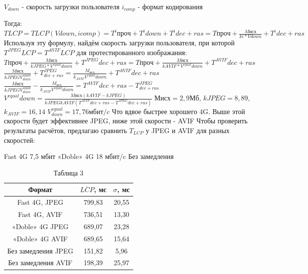 \documentclass[12pt]{article}
\begin{document}
$V_{down}$ - скорость загрузки пользователя
$i_{comp}$ - формат кодирования

Тогда:
$
T{LCP} = T{LCP}(V{down}, i{comp}) = T^{i}{проч} + T^{i}{down} + T^{i}{dec+ras} = T{проч} + \frac{M{исх}}{k{i}*V{down}} + T^{i}{dec+ras}
$
Используя эту формулу, найдём скорость загрузки пользователя, при которой $T^{JPEG}{LCP} = T^{AVIF}{LCP}$ для протестированного изображания:
$
T{проч} + \frac{M{исх}}{k{JPEG}*V^{equal}{down}} + T^{JPEG}{dec+ras} = T{проч} + \frac{M{исх}}{k{AVIF}*V^{equal}{down}} + T^{AVIF}{dec+ras}
$
$
\frac{M{исх}}{k{JPEG}V^{equal}_{down}} + T^{JPEG}_{dec+ras} = \frac{M_{исх}}{k_{AVIF}V^{equal}{down}} + T^{AVIF}{dec+ras}
$
$
\frac{M{исх}}{k{JPEG}V^{equal}_{down}} - \frac{M_{исх}}{k_{AVIF}V^{equal}{down}}  = T^{AVIF}{dec+ras} - T^{JPEG}_{dec+ras}
$
$
V^{equal}{down} = \frac{M{исх}(k{AVIF}-k{JPEG})}{k{JPEG}k{AVIF}(T^{AVIF}{dec+ras} - T^{JPEG}{dec+ras})}
$
$М{исх} = 2,9$Мб, $k{JPEG} = 8,89$, $k_{AVIF} = 16,14$
$
V^{equal}_{down} = 17,76 мбит/c
$
Что вдвое быстрее хорошего 4G. Выше этой скорости будет эффективнее JPEG, ниже этой скорости - AVIF
Чтобы проверить результаты расчётов, предлагаю сравнить $T_{LCP}$ у JPEG и AVIF для разных скоростей:

Fast 4G 7,5 мбит
«Doble» 4G 18 мбит/c
Без замедления

\begin{table}[h!]
\centering
\caption{Таблица 3}
\begin{tabular}{|c|c|c|}
\hline
Формат & $\overline{LCP}$, мс & $\sigma$, мс \\
\hline
Fast 4G, JPEG & 799,83 & 20,55 \\
\hline
Fast 4G, AVIF & 736,51 & 13,30 \\
\hline
«Doble» 4G JPEG & 689,07 & 23,28 \\
\hline
«Doble» 4G AVIF & 689,65 & 15,64 \\
\hline
Без замедления JPEG & 151,82 & 5,96 \\
\hline
Без замедления AVIF & 198,39 & 25,97 \\
\hline
\end{tabular}
\end{table}
\end{document}
